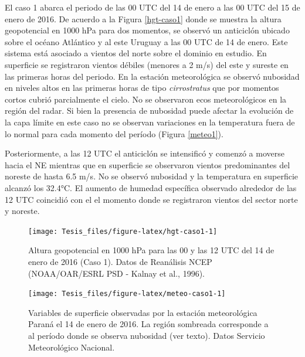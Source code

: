 \documentclass[12pt,spanish,oneside, a4paper]{book}
\begin{document}
El caso 1 abarca el periodo de las 00 UTC del 14 de enero a las 00 UTC
del 15 de enero de 2016. De acuerdo a la Figura \ref{hgt-caso1} donde se
muestra la altura geopotencial en 1000 hPa para dos momentos, se observó
un anticiclón ubicado sobre el océano Atlántico y al este Uruguay a las
00 UTC de 14 de enero. Este sistema está asociado a vientos del norte
sobre el dominio en estudio. En superficie se registraron vientos
débiles (menores a 2 m/s) del este y sureste en las primeras horas del
periodo. En la estación meteorológica se observó nubosidad en niveles
altos en las primeras horas de tipo \emph{cirrostratus} que por momentos
cortos cubrió parcialmente el cielo. No se observaron ecos
meteorológicos en la región del radar. Si bien la presencia de nubosidad
puede afectar la evolución de la capa límite en este caso no se observan
variaciones en la temperatura fuera de lo normal para cada momento del
período (Figura \ref{meteo1}).

Posteriormente, a las 12 UTC el anticiclón se intensificó y comenzó a
moverse hacia el NE mientras que en superficie se observaron vientos
predominantes del noreste de hasta 6.5 m/s. No se observó nubosidad y la
temperatura en superficie alcanzó los 32.4°C. El aumento de humedad
específica observado alrededor de las 12 UTC coincidió con el el momento
donde se registraron vientos del sector norte y noreste.

\begin{figure}

{\centering \texttt{[image: Tesis\_files/figure-latex/hgt-caso1-1]} 

}

\caption{Altura geopotencial en 1000 hPa para las 00 y las 12 UTC del 14 de enero de 2016 (Caso 1). Datos de Reanálisis NCEP (NOAA/OAR/ESRL PSD - Kalnay et al., 1996). \label{hgt-caso1}}\label{fig:hgt-caso1}
\end{figure}

\begin{figure}

{\centering \texttt{[image: Tesis\_files/figure-latex/meteo-caso1-1]} 

}

\caption{Variables de superficie observadas por la estación meteorológica Paraná el 14 de enero de 2016. La región sombreada corresponde a al período donde se observa nubosidad (ver texto). Datos Servicio Meteorológico Nacional. \label{meteo1}}\label{fig:meteo-caso1}
\end{figure}
\end{document}
